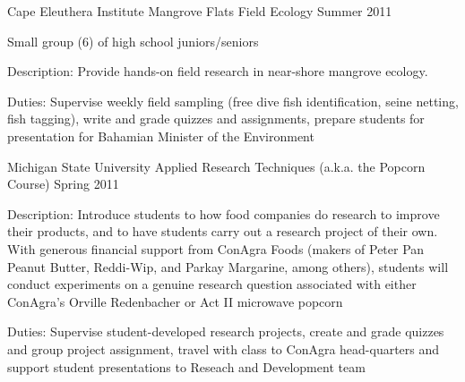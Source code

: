 \begin{cventries}
  \cventry
    {Cape Eleuthera Institute} %
    {Mangrove Flats Field Ecology} %
    {} %
    {Summer 2011} %
    {
      \begin{cvitems} %
        \item {Small group (6) of high school juniors/seniors}
        \item {Description: Provide hands-on field research in near-shore mangrove ecology.}
        \item {Duties: Supervise weekly field sampling (free dive fish identification, seine netting, fish tagging), write and grade quizzes and assignments, prepare students for presentation for Bahamian Minister of the Environment}
      \end{cvitems}
    }

  \cventry
    {Michigan State University} %
    {Applied Research Techniques (a.k.a. the Popcorn Course)} %
    {} %
    {Spring 2011} %
    {
      \begin{cvitems} %
        \item {Description: Introduce students to how food companies do research to improve their products, and to have students carry out a research project of their own. With generous financial support from ConAgra Foods (makers of Peter Pan Peanut Butter, Reddi-Wip, and Parkay Margarine, among others), students will conduct experiments on a genuine research question associated with either ConAgra's Orville Redenbacher or Act II microwave popcorn}
        \item {Duties: Supervise student-developed research projects, create and grade quizzes and group project assignment, travel with class to ConAgra head-quarters and support student presentations to Reseach and Development team}
      \end{cvitems}
    }


\end{cventries}
